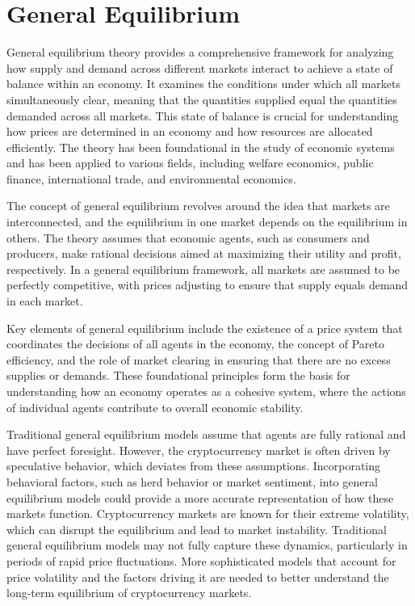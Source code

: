 \section{General Equilibrium}\label{cTGE}
General equilibrium theory provides a comprehensive framework for analyzing how supply and demand across different markets interact to achieve a state of balance within an economy. It examines the conditions under which all markets simultaneously clear, meaning that the quantities supplied equal the quantities demanded across all markets. This state of balance is crucial for understanding how prices are determined in an economy and how resources are allocated efficiently. The theory has been foundational in the study of economic systems and has been applied to various fields, including welfare economics, public finance, international trade, and environmental economics.

The concept of general equilibrium revolves around the idea that markets are interconnected, and the equilibrium in one market depends on the equilibrium in others. The theory assumes that economic agents, such as consumers and producers, make rational decisions aimed at maximizing their utility and profit, respectively. In a general equilibrium framework, all markets are assumed to be perfectly competitive, with prices adjusting to ensure that supply equals demand in each market.

Key elements of general equilibrium include the existence of a price system that coordinates the decisions of all agents in the economy, the concept of Pareto efficiency, and the role of market clearing in ensuring that there are no excess supplies or demands. These foundational principles form the basis for understanding how an economy operates as a cohesive system, where the actions of individual agents contribute to overall economic stability.

Traditional general equilibrium models assume that agents are fully rational and have perfect foresight. However, the cryptocurrency market is often driven by speculative behavior, which deviates from these assumptions. Incorporating behavioral factors, such as herd behavior or market sentiment, into general equilibrium models could provide a more accurate representation of how these markets function.
Cryptocurrency markets are known for their extreme volatility, which can disrupt the equilibrium and lead to market instability. Traditional general equilibrium models may not fully capture these dynamics, particularly in periods of rapid price fluctuations. More sophisticated models that account for price volatility and the factors driving it are needed to better understand the long-term equilibrium of cryptocurrency markets.

